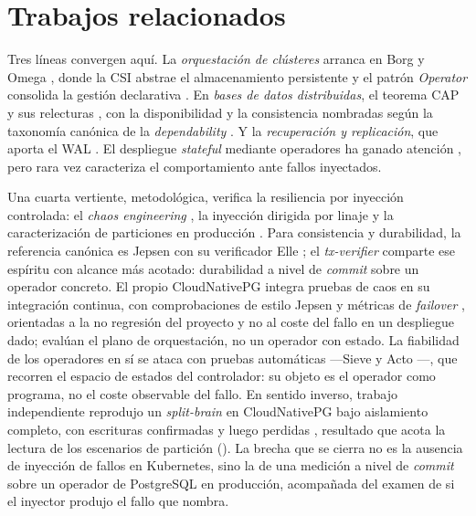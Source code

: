 \section{Trabajos relacionados}\label{sec:rel}
Tres líneas convergen aquí. La \emph{orquestación de clústeres} arranca en Borg y Omega \citep{schwarzkopf2013,burns2016}, donde la CSI abstrae el almacenamiento persistente \citep{k8s2024csi} y el patrón \textit{Operator} consolida la gestión declarativa \citep{k8s2026operator}. En \emph{bases de datos distribuidas}, el teorema CAP y sus relecturas \citep{gilbert2002,abadi2012,bailis2013}, con la disponibilidad y la consistencia nombradas según la taxonomía canónica de la \textit{dependability} \citep{avizienis2004}. Y la \emph{recuperación y replicación}, que aporta el WAL \citep{mohan1992,han2024}. El despliegue \textit{stateful} mediante operadores ha ganado atención \citep{dobies2020,mega2023}, pero rara vez caracteriza el comportamiento ante fallos inyectados.

Una cuarta vertiente, metodológica, verifica la resiliencia por inyección controlada: el \textit{chaos engineering} \citep{basiri2016}, la inyección dirigida por linaje \citep{alvaro2018} y la caracterización de particiones en producción \citep{alquraan2018}. Para consistencia y durabilidad, la referencia canónica es Jepsen con su verificador Elle \citep{kingsbury2020}; el \textit{tx-verifier} comparte ese espíritu con alcance más acotado: durabilidad a nivel de \textit{commit} sobre un operador concreto. El propio CloudNativePG integra pruebas de caos en su integración continua, con comprobaciones de estilo Jepsen y métricas de \textit{failover} \citep{drees2026}, orientadas a la no regresión del proyecto y no al coste del fallo en un despliegue dado; \citet{chen2026} evalúan el plano de orquestación, no un operador con estado. La fiabilidad de los operadores en sí se ataca con pruebas automáticas —Sieve \citep{sun2022} y Acto \citep{gu2023}—, que recorren el espacio de estados del controlador: su objeto es el operador como programa, no el coste observable del fallo. En sentido inverso, trabajo independiente reprodujo un \textit{split-brain} en CloudNativePG bajo aislamiento completo, con escrituras confirmadas y luego perdidas \citep{sivko2026}, resultado que acota la lectura de los escenarios de partición (). La brecha que se cierra no es la ausencia de inyección de fallos en Kubernetes, sino la de una medición a nivel de \textit{commit} sobre un operador de PostgreSQL en producción, acompañada del examen de si el inyector produjo el fallo que nombra.

